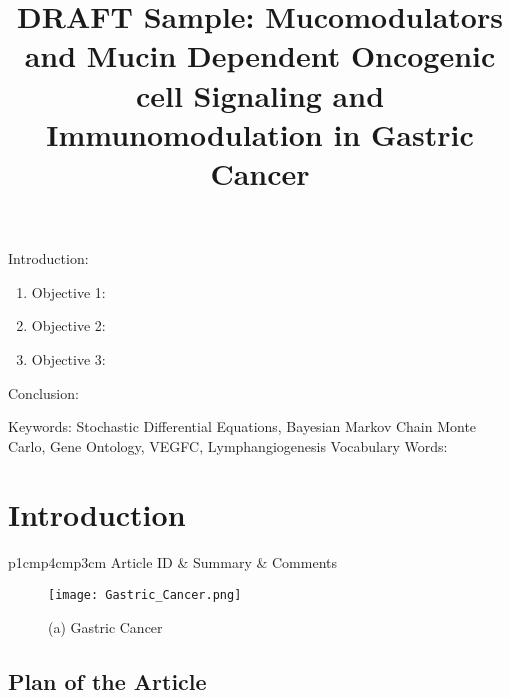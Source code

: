 

\twocolumn
\scriptsize
\begin{frontmatter}
		\title{DRAFT Sample: Mucomodulators and Mucin Dependent Oncogenic cell Signaling and Immunomodulation in Gastric Cancer}
		\author{}
		\address{The Mathematical Learning Space}
\end{frontmatter}	

Introduction:
\begin{enumerate}
\item Objective 1:
\item Objective 2:
\item Objective 3:
\end{enumerate}
Conclusion:

Keywords: Stochastic Differential Equations, Bayesian Markov Chain Monte Carlo, Gene Ontology, VEGFC, Lymphangiogenesis
Vocabulary Words:

\section{Introduction}

\begin{table}[H]\centering
	\begin{tabular}{p{1cm}p{4cm}p{3cm}}
		Article ID & Summary & Comments\\
		\hline
		\hline
	\end{tabular}
\end{table}

\begin{figure}[H]
\begin{minipage}[b]{0.3\linewidth}
\texttt{[image: Gastric\_Cancer.png]} 
\end{minipage}\hfill
\caption{(a) Gastric Cancer}
\label{fig:Figure1}
\end{figure} 


\subsection{Plan of the Article}

\begin{enumerate}
\end{enumerate}

